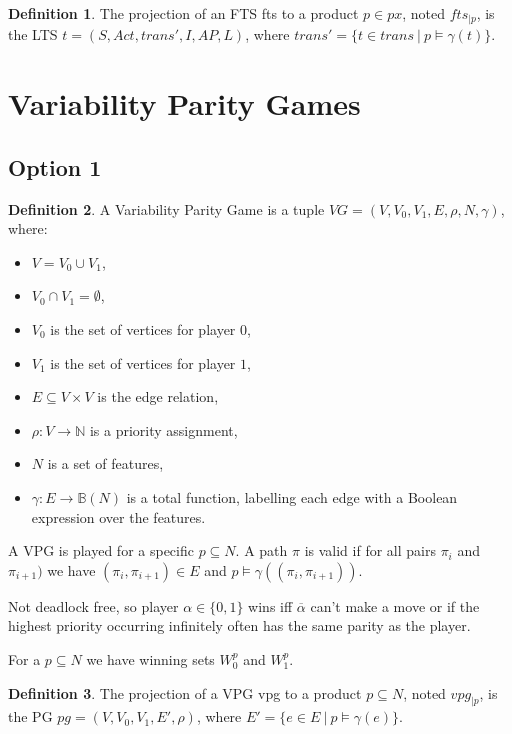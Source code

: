 \documentclass[]{article}
\theoremstyle{definition}
\newtheorem{definition}{Definition}[section]
\begin{document}
\begin{definition}
	The projection of an FTS fts to a product $p \in px$, noted $fts_{|p}$, is the LTS $t=(S,Act,trans', I, AP, L)$, where $trans' = \{t \in trans\ |\ p \models \gamma(t)\}$.
\end{definition}

\section{Variability Parity Games}
\subsection{Option 1}
\begin{definition}
	A Variability Parity Game is a tuple $VG = (V,V_0, V_1, E, \rho, N, \gamma)$, where:
	\begin{itemize}
		\item $V = V_0 \cup V_1$,
		\item $V_0 \cap V_1 = \emptyset$,
		\item $V_0$ is the set of vertices for player $0$,
		\item $V_1$ is the set of vertices for player $1$, 
		\item $E \subseteq V \times V$ is the edge relation,
		\item $\rho :  V \rightarrow \mathbb{N}$ is a priority assignment,
		\item $N$ is a set of features,
		\item $\gamma : E \rightarrow \mathbb{B}(N)$ is a total function, labelling each edge with a Boolean expression over the features.
	\end{itemize}
\end{definition}
A VPG is played for a specific $p \subseteq N$. A path $\pi$ is valid if for all pairs $\pi_i$ and  $\pi_{i+1})$ we have $(\pi_i, \pi_{i+1}) \in E$ and $p \models \gamma((\pi_i, \pi_{i+1}))$.

Not deadlock free, so player $\alpha \in \{0,1\}$ wins iff $\overline{\alpha}$ can't make a move or if the highest priority occurring infinitely often has the same parity as the player.

For a $p \subseteq N$ we have winning sets $W_0^p$ and $W_1^p$.

\begin{definition}
	The projection of a VPG vpg to a product $p \subseteq N$, noted $vpg_{|p}$, is the PG $pg = (V, V_0, V_1, E', \rho)$, where $E' = \{ e \in E\ |\ p \models \gamma(e)\}$.
\end{definition}
\end{document}
